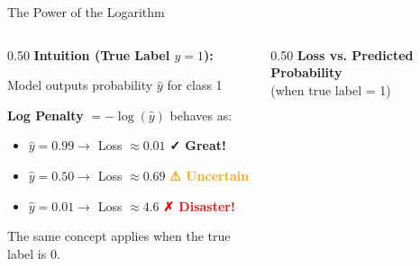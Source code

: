 \begin{frame}{The Power of the Logarithm}
    \begin{columns}[T]
        \begin{column}{0.50\textwidth}
            \textbf{Intuition (True Label $y=1$):}
            \vspace{0.5em}
            
            Model outputs probability $\hat{y}$ for class 1
            
            \vspace{0.5em}
            \textbf{Log Penalty} $= -\log(\hat{y})$ behaves as:
            \begin{itemize}
                \item $\hat{y} = 0.99 \to$ Loss $\approx 0.01$ \textcolor{green!60!black}{\textbf{✓ Great!}}
                \vspace{0.3em}
                \item $\hat{y} = 0.50 \to$ Loss $\approx 0.69$ \textcolor{orange}{\textbf{⚠ Uncertain}}
                \vspace{0.3em}
                \item $\hat{y} = 0.01 \to$ Loss $\approx 4.6$ \textcolor{red}{\textbf{✗ Disaster!}}
            \end{itemize}
            
            \vspace{1em}
            \begin{tcolorbox}[colback=yellow!10, colframe=orange, boxsep=4pt]
                The same concept applies when the true label is 0.
            \end{tcolorbox}
        \end{column}

        \begin{column}{0.50\textwidth}
            \centering
            \textbf{Loss vs. Predicted Probability}\\
            \vspace{-0.2em}
            \small (when true label = 1)
            \vspace{0.3em}
            
\end{column}
\end{columns}
\end{frame}
